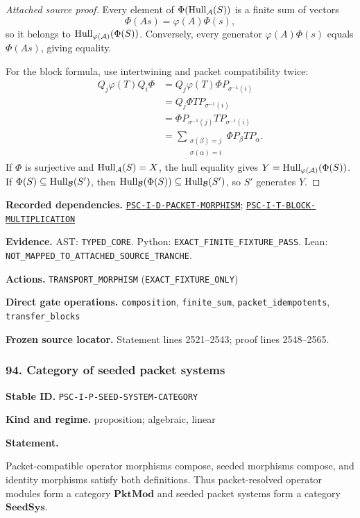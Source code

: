 \documentclass[a4paper,11pt]{article}
\newcommand{\Hull}{\operatorname{Hull}}\newcommand{\srank}{\operatorname{srank}}\newcommand{\psrank}{\operatorname{psrank}}\newcommand{\End}{\operatorname{End}}\newcommand{\Hom}{\operatorname{Hom}}\newcommand{\im}{\operatorname{im}}\newcommand{\Ker}{\operatorname{Ker}}\newcommand{\Jac}{\operatorname{Jac}}\newcommand{\Irr}{\operatorname{Irr}}\newcommand{\Span}{\operatorname{span}}\newcommand{\alg}{\operatorname{alg}}\newcommand{\Reach}{\operatorname{Reach}}\newcommand{\Supp}{\operatorname{Supp}}\newcommand{\id}{\mathrm{id}}\newcommand{\cl}[1]{\overline{#1}}
\newcommand{\field}[2]{\noindent\textbf{#1.} #2\par}
\begin{document}
\begin{proof}[Attached source proof]
Every element of $\Phi(\Hull_\A(S))$ is a finite sum of vectors
\[
\Phi(As)=\varphi(A)\Phi(s),
\]
so it belongs to $\Hull_{\varphi(\A)}(\Phi(S))$.  Conversely, every generator $\varphi(A)\Phi(s)$ equals $\Phi(As)$, giving equality.

For the block formula, use intertwining and packet compatibility twice:
\begin{align*}
Q_j\varphi(T)Q_i\Phi
&=Q_j\varphi(T)\Phi P_{\sigma^{-1}(i)}\\
&=Q_j\Phi TP_{\sigma^{-1}(i)}\\
&=\Phi P_{\sigma^{-1}(j)}TP_{\sigma^{-1}(i)}\\
&=\sum_{\substack{\sigma(\beta)=j\\\sigma(\alpha)=i}}
\Phi P_\beta TP_\alpha.
\end{align*}
If $\Phi$ is surjective and $\Hull_\A(S)=X$, the hull equality gives $Y=\Hull_{\varphi(\A)}(\Phi(S))$.  If $\Phi(S)\subseteq\Hull_\B(S')$, then $\Hull_\B(\Phi(S))\subseteq\Hull_\B(S')$, so $S'$ generates $Y$.
\end{proof}
\field{Recorded dependencies}{\hyperref[rec:PSC-I-D-PACKET-MORPHISM]{\nolinkurl{PSC-I-D-PACKET-MORPHISM}}; \hyperref[rec:PSC-I-T-BLOCK-MULTIPLICATION]{\nolinkurl{PSC-I-T-BLOCK-MULTIPLICATION}}}
\field{Evidence}{AST: \nolinkurl{TYPED_CORE}. Python: \nolinkurl{EXACT_FINITE_FIXTURE_PASS}. Lean: \nolinkurl{NOT_MAPPED_TO_ATTACHED_SOURCE_TRANCHE}.}
\field{Actions}{\nolinkurl{TRANSPORT_MORPHISM} (\nolinkurl{EXACT_FIXTURE_ONLY})}
\field{Direct gate operations}{\nolinkurl{composition}, \nolinkurl{finite_sum}, \nolinkurl{packet_idempotents}, \nolinkurl{transfer_blocks}}
\field{Frozen source locator}{Statement lines 2521--2543; proof lines 2548--2565.}
\subsubsection*{94. Category of seeded packet systems}
\label{rec:PSC-I-P-SEED-SYSTEM-CATEGORY}
\field{Stable ID}{\nolinkurl{PSC-I-P-SEED-SYSTEM-CATEGORY}}
\field{Kind and regime}{proposition; algebraic, linear}
\textbf{Statement.}\par
Packet-compatible operator morphisms compose, seeded morphisms compose, and identity morphisms satisfy both definitions.  Thus packet-resolved operator modules form a category $\mathbf{PktMod}$ and seeded packet systems form a category $\mathbf{SeedSys}$.
\end{document}
